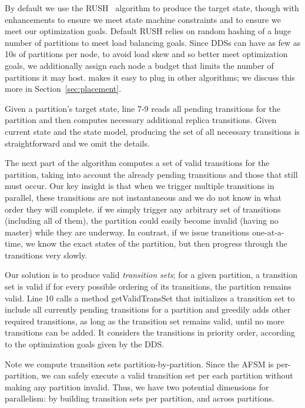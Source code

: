 By default we use the RUSH~\cite{honicky04} algorithm to produce the target state,
though with enhancements to ensure we meet state machine constraints and to
ensure we meet our optimization goals.  Default RUSH relies on
random hashing of a huge number of partitions to meet load balancing goals.
Since DDSs can have as few as 10s of partitions per node, to avoid load skew and
so better meet optimization goals, we
additionally assign each node a budget that limits the number of partitions it
may host.  \helix makes it easy to plug in other algorithms; we
discuss this more in Section~\ref{sec:placement}.

Given a partition's target state, line 7-9 reads all pending transitions for the
partition and then computes necessary additional replica transitions.
Given current state and the state model, producing the set of all necessary
transitions is straightforward
and we omit the details.

The next part of the algorithm computes a set of valid transitions for the
partition, taking into account the already pending transitions and those that
still must occur.  Our key insight is that when we trigger multiple transitions
in parallel, these transitions are not instantaneous and we do not know in what
order they will complete.  if we simply trigger any arbitrary
set of transitions (including all of them), the partition could easily become
invalid (\eg having no master) while they are underway.  In contrast, if we
issue transitions one-at-a-time, we know the exact states of the partition, but
then progress through the transitions very slowly.

Our solution is to produce valid \emph{transition sets}; for a given
partition, a transition set is valid if
for every possible ordering of its transitions, the partition remains valid.    
Line 10 calls a method getValidTransSet that initializes a
transition set to include all
currently pending transitions for a partition and greedily adds other required
transitions, as long as the transition set remains valid, until no more
transitions can be added.  It considers the transitions in priority order,
according to the optimization goals given by the DDS.

Note we compute transition sets partition-by-partition.  Since the AFSM is
per-partition, we can safely execute a valid transition set per each partition
without making any partition invalid.  Thus, we have two potential dimensions for
parallelism: by building transition sets per partition, and across partitions.

